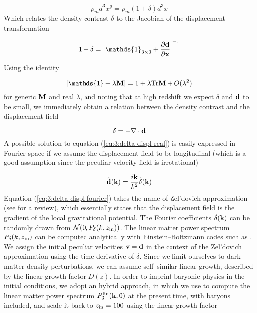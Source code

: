 \begin{equation}
\label{eq:3:masscons}
\rho_m d^3 x^g = \rho_m(1+\delta)d^3x
\end{equation} 
%
Which relates the density contrast $\delta$ to the Jacobian of the displacement transformation 

\begin{equation}
\label{eq:3:delta-displ}
1+\delta = \left\vert\mathds{1}_{3\times 3}+\frac{\partial \bb{d}}{\partial \bb{x}}\right\vert^{-1}
\end{equation}
%
Using the identity

\begin{equation}
\label{eq:3:det-identity}
\vert\mathds{1}+\lambda\bb{M}\vert = 1 + \lambda\Tr\bb{M} + O(\lambda^2)
\end{equation}
%
for generic $\mathbf{M}$ and real $\lambda$, and noting that at high redshift we expect $\delta$ and $\mathbf{d}$ to be small, we immediately obtain a relation between the density contrast and the displacement field 

\begin{equation}
\label{eq:3:delta-displ-real}
\delta = -\nabla\cdot\mathbf{d}
\end{equation}
%
A possible solution to equation (\ref{eq:3:delta-displ-real}) is easily expressed in Fourier space if we assume the displacement field to be longitudinal (which is a good assumption since the peculiar velocity field is irrotational)

\begin{equation}
\label{eq:3:delta-displ-fourier}
\tilde{\mathbf{d}}(\mathbf{k}) = \frac{i\mathbf{k}}{k^2}\tilde{\delta}(\mathbf{k})
\end{equation}
%
Equation (\ref{eq:3:delta-displ-fourier}) takes the name of Zel'dovich approximation (see \citep{ZeldovichWhite} for a review), which essentially states that the displacement field is the gradient of the local gravitational potential. The Fourier coefficients $\tilde{\delta}(\mathbf{k})$ can be randomly drawn from $\mathcal{N}(0,P_\delta(k,z_{\rm in}))$. The linear matter power spectrum $P_\delta(k,z_{\rm in})$ can be computed analytically with Einstein--Boltzmann codes such as  \citep{CAMB}. We assign the initial peculiar velocities $\mathbf{v}=\dot{\mathbf{d}}$ in the context of the Zel'dovich approximation using the time derivative of $\delta$. Since we limit ourselves to dark matter density perturbations, we can assume self--similar linear growth, described by the linear growth factor $D(z)$. In order to imprint baryonic physics in the initial conditions, we adopt an hybrid approach, in which we use  to compute the linear matter power spectrum $P^{\rm lin}_\delta(\mathbf{k},0)$ at the present time, with baryons included, and scale it back to $z_{\rm in}=100$ using the linear growth factor

